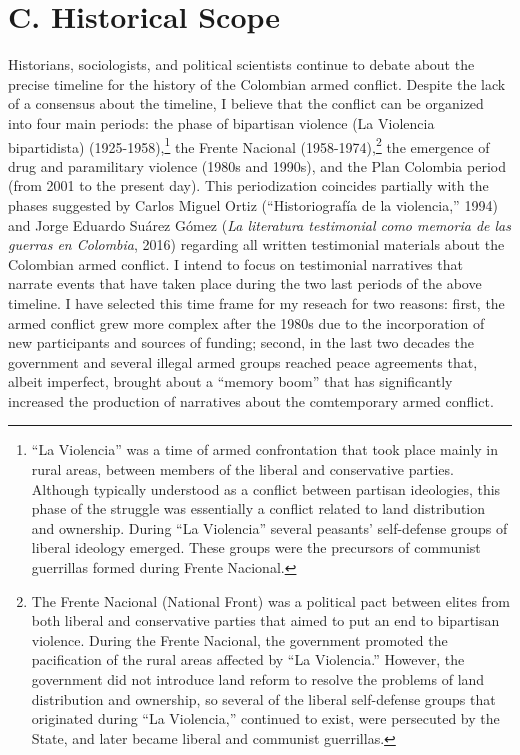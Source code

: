 \documentclass[
  11pt,
,
onecolumn,
openany
]{book}
\begin{document}
\hypertarget{c.-historical-scope}{%
\section{C. Historical Scope}\label{c.-historical-scope}}

Historians, sociologists, and political scientists continue to debate about
the precise timeline for the history of the Colombian armed conflict. Despite
the lack of a consensus about the timeline, I believe that the conflict can be
organized into four main periods: the phase of bipartisan violence (La
Violencia bipartidista) (1925-1958),\footnote{``La Violencia'' was a time of
  armed confrontation that took place mainly in rural areas, between members
  of the liberal and conservative parties. Although typically understood as a
  conflict between partisan ideologies, this phase of the struggle was
  essentially a conflict related to land distribution and ownership. During
  ``La Violencia'' several peasants' self-defense groups of liberal ideology
  emerged. These groups were the precursors of communist guerrillas formed
  during Frente Nacional.} the Frente Nacional (1958-1974),\footnote{The
  Frente Nacional (National Front) was a political pact between elites from
  both liberal and conservative parties that aimed to put an end to bipartisan
  violence. During the Frente Nacional, the government promoted the
  pacification of the rural areas affected by ``La Violencia.'' However, the
  government did not introduce land reform to resolve the problems of land
  distribution and ownership, so several of the liberal self-defense groups
  that originated during ``La Violencia,'' continued to exist, were persecuted
  by the State, and later became liberal and communist guerrillas.} the
emergence of drug and paramilitary violence (1980s and 1990s), and the Plan
Colombia period (from 2001 to the present day). This periodization coincides
partially with the phases suggested by Carlos Miguel Ortiz (``Historiografía
de la violencia,'' 1994) and Jorge Eduardo Suárez Gómez (\emph{La literatura
testimonial como memoria de las guerras en Colombia}, 2016) regarding all
written testimonial materials about the Colombian armed conflict. I intend to
focus on testimonial narratives that narrate events that have taken place
during the two last periods of the above timeline. I have selected this time
frame for my reseach for two reasons: first, the armed conflict grew more
complex after the 1980s due to the incorporation of new participants and
sources of funding; second, in the last two decades the government and several
illegal armed groups reached peace agreements that, albeit imperfect, brought
about a ``memory boom'' that has significantly increased the production of
narratives about the comtemporary armed conflict.
\end{document}
